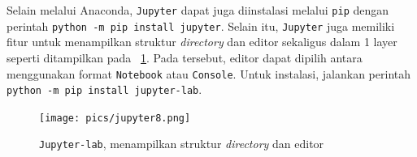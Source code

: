 Selain melalui Anaconda, \texttt{Jupyter} dapat juga diinstalasi melalui \texttt{pip} dengan perintah \texttt{python -m pip install jupyter}. Selain itu, \texttt{Jupyter} juga memiliki fitur untuk menampilkan struktur \textit{directory} dan editor sekaligus dalam 1 layer seperti ditampilkan pada \figurename~\ref{fig:jupyter8}. Pada \figurename tersebut, editor dapat dipilih antara menggunakan format \texttt{Notebook} atau \texttt{Console}. Untuk instalasi, jalankan perintah \texttt{python -m pip install jupyter-lab}.

\begin{figure}
  \begin{center}
    \texttt{[image: pics/jupyter8.png]}
    \caption{\texttt{Jupyter-lab}, menampilkan struktur \textit{directory} dan editor}
    \label{fig:jupyter8}
  \end{center}
\end{figure}
